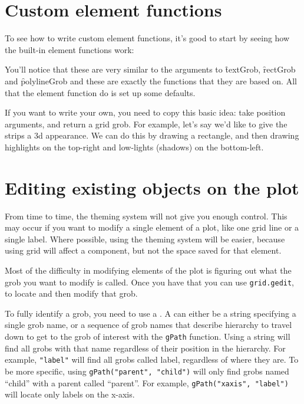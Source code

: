 \section{Custom element functions}
\label{sec:custom-elements}

To see how to write custom element functions, it's good to start by seeing how the built-in element functions work:

% 


You'll notice that these are very similar to the arguments to \f{textGrob}, \f{rectGrob} and \f{polylineGrob} and these are exactly the functions that they are based on.  All that the element function do is set up some defaults.  

If you want to write your own, you need to copy this basic idea: take position arguments, and return a grid grob.  For example, let's say we'd like to give the strips a 3d appearance.  We can do this by drawing a rectangle, and then drawing highlights on the top-right and low-lights (shadows) on the bottom-left.


\section{Editing existing objects on the plot}
\label{sec:grid-existing}

From time to time, the theming system will not give you enough control.  This may occur if you want to modify a single element of a plot, like one grid line or a single label.  Where possible, using the theming system will be easier, because using grid will affect a component, but not the space saved for that element.

Most of the difficulty in modifying elements of the plot is figuring out what the grob you want to modify is called.  Once you have that you can use {\tt grid.gedit}, to locate and then modify that grob. 

To fully identify a grob, you need to use a .  A  can either be a string specifying a single grob name, or a sequence of grob names that describe hierarchy to travel down to get to the grob of interest with the {\tt gPath} function.  Using a string will find all grobs with that name regardless of their position in the hierarchy.  For example, {\tt "label"} will find all grobs called label, regardless of where they are.  To be more specific, using {\tt gPath("parent", "child")} will only find grobs named ``child'' with a parent called ``parent''.  For example, {\tt gPath("xaxis", "label")} will locate only labels on the x-axis.

